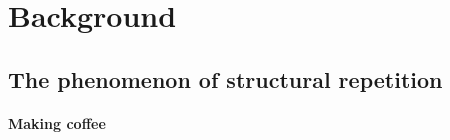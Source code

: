 %
%
%






\setlength{\parindent}{0pt}
\setlength{\parskip}{0pt} %
% 
% 
% 
% 
% 

\cleardoublepage
{}
\tableofcontents

% 


\setlength{\parskip}{1em}


\mainmatter

\cleardoublepage
\part{Background}
\chapter{The phenomenon of structural repetition}
    
    
        \subsection{Making coffee} 
